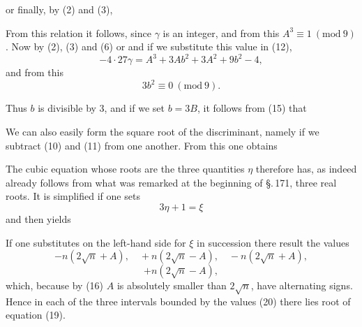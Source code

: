 or finally, by (2) and (3),

From this relation it follows, since $\gamma$ is an integer,
and from this $A^3 \equiv 1\ (\mathrm{mod}\ 9)$. Now by (2), (3) and (6)
or
and if we substitute this value in (12),
\[
-4\cdot 27\gamma = A^3 + 3Ab^2 + 3A^2 + 9b^2 - 4,
\]
and from this
\[
3b^2 \equiv 0\ (\mathrm{mod}\ 9).
\]

Thus $b$ is divisible by 3, and if we set $b = 3B$,
it follows from (15) that

We can also easily form the square root of the dis\-criminant, namely
if we subtract (10) and (11) from one another. From this one
obtains

The cubic equation whose roots are the three quantities $\eta$
therefore has, as indeed already follows from what was remarked at the
beginning of \S.\,171, three real roots. It is simplified
if one sets
\[
3\eta + 1 = \xi
\]
and then yields

If one substitutes on the left-hand side for $\xi$ in succession
there result the values
\[
-n(2\sqrt{n} + A), \quad +n(2\sqrt{n} - A), \quad -n(2\sqrt{n} + A),
\]
\[
+n(2\sqrt{n} - A),
\]
which, because by (16) $A$ is absolutely smaller than $2\sqrt{n}$, have alternating
signs. Hence in each of the three intervals bounded by the
values (20) there lies  root of equation (19).
